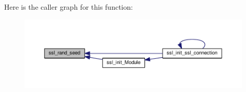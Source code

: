 Here is the caller graph for this function\+:
\nopagebreak
\begin{figure}[H]
\begin{center}
\leavevmode
\includegraphics[width=350pt]{group__MOD__SSL__PRIVATE_gaf0f8bd768edad2c6d116a824f0762b7f_icgraph}
\end{center}
\end{figure}


